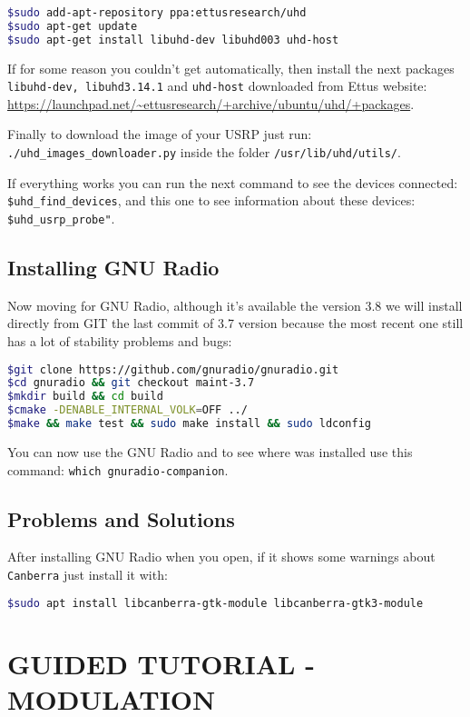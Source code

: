 \documentclass[a4paper, 10pt, conference]{ieeeconf}      %
\begin{document}
\begin{lstlisting}[language=bash, breaklines]
$sudo add-apt-repository ppa:ettusresearch/uhd
$sudo apt-get update
$sudo apt-get install libuhd-dev libuhd003 uhd-host
\end{lstlisting}

If for some reason you couldn't get automatically, then install the next packages \verb|libuhd-dev, libuhd3.14.1| and \verb|uhd-host| downloaded from Ettus website: \url{https://launchpad.net/~ettusresearch/+archive/ubuntu/uhd/+packages}.

Finally to download the image of your USRP just run: 
\verb|./uhd_images_downloader.py| inside the folder \verb|/usr/lib/uhd/utils/|.

If everything works you can run the next command to see the devices connected:
\verb|$uhd_find_devices|, and this one to see information about these devices: \verb|$uhd_usrp_probe"|.

\subsection{Installing GNU Radio}
Now moving for GNU Radio, although it's available the version 3.8 we will install directly from GIT the last commit of 3.7 version because the most recent one still has a lot of stability problems and bugs:

\begin{lstlisting}[language=bash, breaklines]
$git clone https://github.com/gnuradio/gnuradio.git
$cd gnuradio && git checkout maint-3.7
$mkdir build && cd build
$cmake -DENABLE_INTERNAL_VOLK=OFF ../
$make && make test && sudo make install && sudo ldconfig
\end{lstlisting}

You can now use the GNU Radio and to see where was installed use this command: \verb|which gnuradio-companion|.

\subsection{Problems and Solutions}
After installing GNU Radio when you open, if it shows some warnings about \verb|Canberra| just install it with:
\begin{lstlisting}[language=bash, breaklines]
$sudo apt install libcanberra-gtk-module libcanberra-gtk3-module
\end{lstlisting}


\section{GUIDED TUTORIAL - MODULATION}
\end{document}
